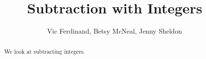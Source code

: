 \documentclass{ximera}
\title{Subtraction with Integers}
\author{Vic Ferdinand, Betsy McNeal, Jenny Sheldon}
\begin{document}
\begin{abstract}
We look at subtracting integers.
\end{abstract}
\maketitle
\end{document}
